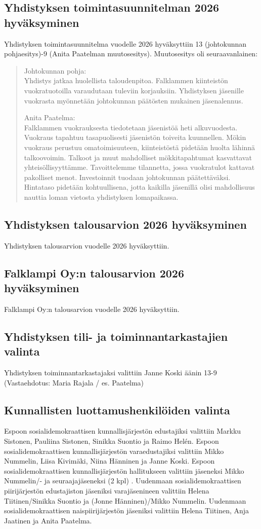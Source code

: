 \documentclass[a4paper,12pt]{article}
\begin{document}
\subsection{Yhdistyksen toimintasuunnitelman 2026 hyväksyminen}
Yhdistyksen toimintasuunnitelma vuodelle 2026 hyväksyttiin 13 (johtokunnan pohjaesitys)-9 (Anita Paatelman muutosesitys). Muutosesitys oli seuraavanlainen:
\begin{quote}
Johtokunnan pohja: \\
Yhdistys jatkaa huolellista taloudenpitoa. Falklammen kiinteistön
vuokratuotoilla varaudutaan tuleviin korjauksiin. Yhdistyksen
jäsenille vuokrasta myönnetään johtokunnan päätösten mukainen
jäsenalennus.

Anita Paatelma: \\
Falklammen vuokrauksesta tiedotetaan
jäsenistöä heti alkuvuodesta. Vuokraus tapahtuu tasapuolisesti
jäsenistön toiveita kuunnellen. Mökin vuokraus perustuu
omatoimisuuteen, kiinteistöstä pidetään huolta lähinnä talkoovoimin.
Talkoot ja muut mahdolliset mökkitapahtumat kasvattavat
yhteisöllisyyttämme. Tavoittelemme tilannetta, jossa vuokratulot
kattavat pakolliset menot. Investoinnit tuodaan johtokunnan
päätettäväksi. Hintataso pidetään kohtuullisena, jotta kaikilla
jäsenillä olisi mahdollisuus nauttia loman vietosta yhdistyksen
lomapaikassa.
\end{quote}
\subsection{Yhdistyksen talousarvion 2026 hyväksyminen}
Yhdistyksen talousarvion vuodelle 2026 hyväksyttiin.
\subsection{Falklampi Oy:n talousarvion 2026 hyväksyminen}
Falklampi Oy:n talousarvion vuodelle 2026 hyväksyttiin.
\subsection{Yhdistyksen tili- ja toiminnantarkastajien valinta}
Yhdistyksen toiminnantarkastajaksi valittiin Janne Koski äänin 13-9 (Vastaehdotus: Maria Rajala / es. Paatelma)
\subsection{Kunnallisten luottamushenkilöiden valinta}
Espoon sosialidemokraattisen kunnallisjärjestön edustajiksi valittiin Markku Sistonen, Pauliina Sistonen, Sinikka Suontio ja Raimo Helén. Espoon sosialidemokraattisen kunnallisjärjestön varaedustajiksi valittiin  Mikko Nummelin, Liisa Kivimäki, Niina Hänninen ja Janne Koski. Espoon sosialidemokraattisen kunnallisjärjestön hallitukseen valittiin jäseneksi Mikko Nummelin/- ja seuraajajäseneksi (2 kpl) . Uudenmaan sosialidemokraattisen piirijärjestön edustajiston jäseniksi varajäsenineen valittiin Helena Tiitinen/Sinikka Suontio ja (Jonne Hänninen)/Mikko Nummelin. Uudenmaan sosialidemokraattisen naispiirijärjestön jäseniksi valittiin Helena Tiitinen, Anja Jaatinen ja Anita Paatelma.
\end{document}
